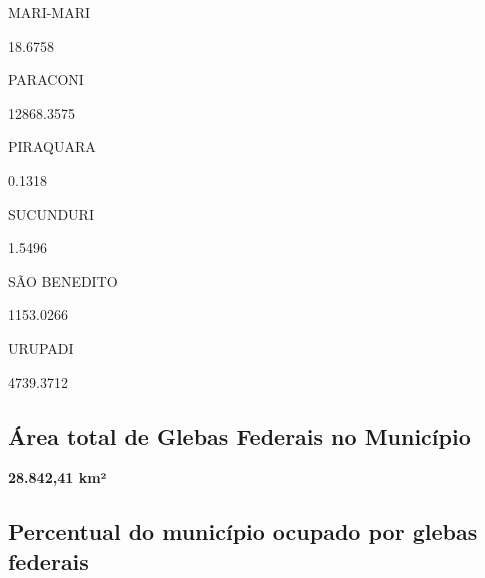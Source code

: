 \documentclass[
  letterpaper,
]{report}
\begin{document}
\n    

\n    

\n      

MARI-MARI

\n      

18.6758

\n    

\n    

\n      

PARACONI

\n      

12868.3575

\n    

\n    

\n      

PIRAQUARA

\n      

0.1318

\n    

\n    

\n      

SUCUNDURI

\n      

1.5496

\n    

\n    

\n      

SÃO BENEDITO

\n      

1153.0266

\n    

\n    

\n      

URUPADI

\n      

4739.3712

\n    

\n  

\n

\hypertarget{uxe1rea-total-de-glebas-federais-no-municuxedpio}{%
\subsection{Área total de Glebas Federais no
Município}\label{uxe1rea-total-de-glebas-federais-no-municuxedpio}}

\textbf{28.842,41 km²}

\hypertarget{percentual-do-municuxedpio-ocupado-por-glebas-federais}{%
\subsection{Percentual do município ocupado por glebas
federais}\label{percentual-do-municuxedpio-ocupado-por-glebas-federais}}
\end{document}
